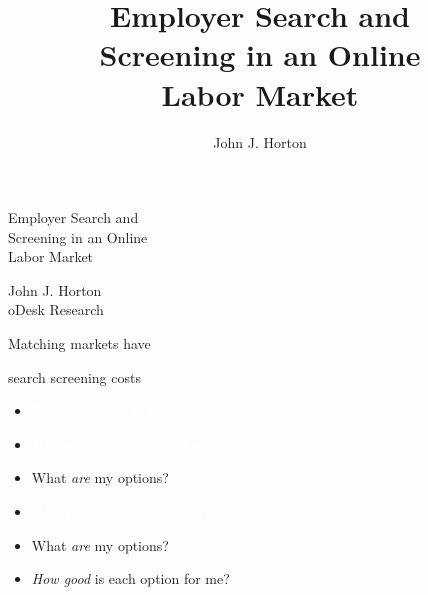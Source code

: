 \documentclass[12pt]{beamer}
\title[Employer Search and Screening in an Online Labor Market]{Employer Search and\\Screening in an Online\\Labor Market}
\author{John J. Horton}
\institute{oDesk Research}
\newcommand*\ouritem{%
\item[\color{black}\scalebox{0.9}{\textbullet}]}
\newcommand*\imgitem{%
\item[\color{white}\scalebox{0.9}{\textbullet}]}
\begin{document}
\setlength{\baselineskip}{12mm}
\fontsize{10mm}{12mm}\selectfont

\begin{frame}
\begin{center}
Employer Search and\\
Screening in an Online\\
Labor Market

\vspace{3mm}

\large
John J. Horton\\
oDesk Research
\end{center}
\end{frame}

\begin{frame}{}
\begin{center}
Matching markets have

search screening costs
\end{center}
\end{frame}

\begin{frame}{}
\begin{animateinline}[autoplay]{2}
\begin{minipage}{\textwidth}
\Large
\begin{itemize}
\imgitem \textcolor{white}{What \emph{are} my options?}

\imgitem \textcolor{white}{\emph{How good} is each option for me?}
\end{itemize}
\end{minipage}
\newframe
\begin{minipage}{\textwidth}
\Large
\begin{itemize}
\ouritem What \emph{are} my options?

\imgitem \textcolor{white}{\emph{How good} is each option for me?}
\end{itemize}
\end{minipage}
\newframe
\begin{minipage}{\textwidth}
\Large
\begin{itemize}
\ouritem What \emph{are} my options?

\ouritem \emph{How good} is each option for me?
\end{itemize}
\end{minipage}
\end{animateinline}
\end{frame}
\end{document}
